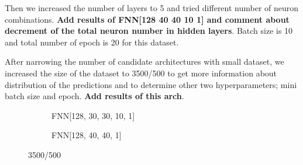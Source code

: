 \documentclass[a4paper,times,12pt]{article}
\begin{document}
Then we increased the number of layers to 5 and tried different number of neuron combinations. \textbf{Add results of FNN[128 40 40 10 1] and comment about decrement of the total neuron number in hidden layers}.  Batch size is 10 and total number of epoch is 20 for this dataset. 

After narrowing the number of candidate architectures with small dataset, we increased the size of the dataset to 3500/500 to get more information about distribution of the predictions and to determine other two hyperparameters; mini batch size and epoch. \textbf{Add results of this arch}.

\begin{figure}[H]
    \centering
    \begin{subfigure}[t]{0.45\textwidth}
		\centering
        
        \caption{FNN[128, 30, 30, 10, 1]}
		\label{fig:a}
    \end{subfigure}\hfill
    \begin{subfigure}[t]{0.45\textwidth}
        \centering
        
        \caption{FNN[128, 40, 40, 1]}
		\label{fig:b}
    \end{subfigure}
    \caption{3500/500}
\end{figure}




\newpage
\end{document}
